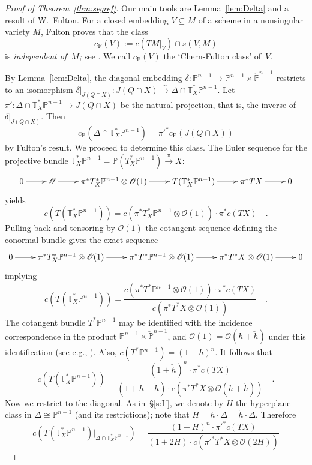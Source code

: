 \documentclass[11pt]{amsart}
\numberwithin{equation}{section}
\newcommand{\Pbb}{{\mathbb{P}}}
\newcommand{\cPbb}{{\check\Pbb}}
\newcommand{\Tbb}{{\mathbb{T}}}
\newcommand{\ch}{\check h}
\newcommand{\cO}{{\mathscr O}}
\newcommand{\cf}{{c_{\text{F}}}}
\begin{document}
\begin{proof}[Proof of Theorem~\ref{thm:segref}]
Our main tools are Lemma~\ref{lem:Delta} and a result of W.~Fulton.
For a closed embedding $V\subseteq M$ of a scheme in a nonsingular variety $M$, 
Fulton proves that the class
\begin{equation}
\cf(V):=c(TM|_V)\cap s(V,M)
\end{equation}
is {\em independent of~$M$;\/} see \cite[Example~4.2.6]{85k:14004}.
We call $\cf(V)$ the `Chern-Fulton class' of~$V$.

By Lemma~\ref{lem:Delta}, the diagonal embedding $\delta: \Pbb^{n-1} \to \Pbb^{n-1}
\times \cPbb^{n-1}$ restricts to an isomorphism
$\delta|_{J(Q\cap X)}: J(Q\cap X) \overset\sim \to \Delta\cap \Tbb^*_X\Pbb^{n-1}$. Let 
$\pi': \Delta\cap \Tbb^*_X\Pbb^{n-1} \to J(Q\cap X)$ be the natural projection,
that is, the inverse of $\delta|_{J(Q\cap X)}$. Then
\begin{equation}\label{eq:cF}
\cf( \Delta\cap \Tbb^*_X\Pbb^{n-1}) = {\pi'}^* \cf(J(Q\cap X))
\end{equation}
by Fulton's result. We proceed to determine
this class. The Euler sequence for the projective bundle $\Tbb^*_X\Pbb^{n-1}
=\Pbb(T^*_X\Pbb^{n-1})\overset\pi\longrightarrow X$:
\[
\xymatrix{
0 \ar[r] & \cO \ar[r] & \pi^* T^*_X\Pbb^{n-1}\otimes \cO(1) \ar[r] & T(\Tbb^*_X\Pbb^{n-1})
\ar[r] & \pi^* TX \ar[r] & 0
}
\]
yields
\[
c(T(\Tbb^*_X\Pbb^{n-1})) = c(\pi^*T^*_X\Pbb^{n-1}\otimes \cO(1))\cdot \pi^*c(TX)\quad.
\]
Pulling back and tensoring by $\cO(1)$ the cotangent sequence defining the conormal
bundle gives the exact sequence
\[
\xymatrix{
0 \ar[r] & \pi^*T^*_X\Pbb^{n-1}\otimes \cO(1) \ar[r] & \pi^*T^*\Pbb^{n-1}\otimes \cO(1)
\ar[r] & \pi^*T^*X\otimes \cO(1) \ar[r] & 0
}
\]
implying
\[
c(T(\Tbb^*_X\Pbb^{n-1})) = \frac{c(\pi^*T^*\Pbb^{n-1}\otimes \cO(1))\cdot \pi^* c(TX)}
{c(\pi^*T^*X\otimes \cO(1))}\quad.
\]
The cotangent bundle $T^*\Pbb^{n-1}$ may be identified with the incidence correspondence
in the product $\Pbb^{n-1}\times \cPbb^{n-1}$, and $\cO(1)=\cO(h+\ch)$ under this identification
(see e.g., \cite[\S2.2]{produa}). Also, $c(T^*\Pbb^{n-1}) = (1-h)^n$. It follows that
\[
c(T(\Tbb^*_X\Pbb^{n-1})) = 
\frac{(1+\ch)^n\cdot \pi^* c(TX)}{(1+h+\ch)\cdot c(\pi^*T^*X\otimes \cO(h+\ch))}\quad.
\]
Now we restrict to the diagonal. As in~\S\ref{s:If}, we denote by $H$ the hyperplane class
in $\Delta\cong \Pbb^{n-1}$ (and its restrictions); note that $H=h\cdot \Delta=\ch\cdot \Delta$.
Therefore
\[
c(T(\Tbb^*_X\Pbb^{n-1})|_{\Delta\cap \Tbb^*_X\Pbb^{n-1}}) = 
\frac{(1+H)^n\cdot {\pi'}^* c(TX)}{(1+2H)\cdot c({\pi'}^*T^*X\otimes \cO(2H))}
\]
\end{proof}
\end{document}
